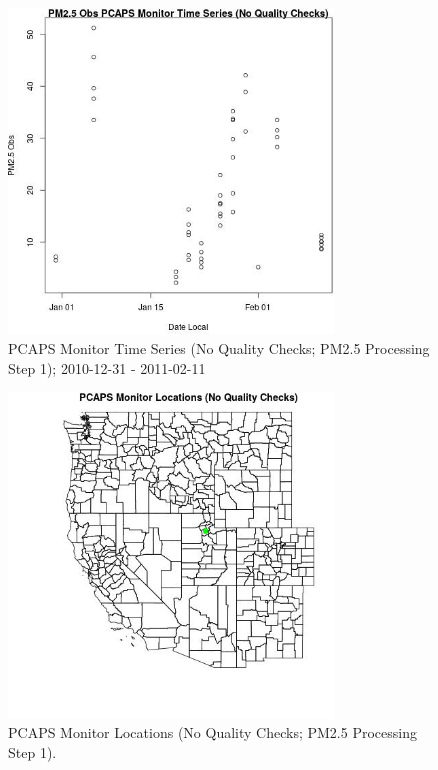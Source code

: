
\begin{figure} 
\centering  
\includegraphics[width=0.77\textwidth]{Code_Outputs/PM25Source4TSstep1_PM25_ObsvDate_Local.jpg} 
\caption{\label{fig:PM25Source4TSstep1PM25_ObsvDate_Local}PCAPS Monitor Time Series (No Quality Checks; PM2.5 Processing Step 1); 2010-12-31 - 2011-02-11} 
\end{figure} 
 

\begin{figure} 
\centering  
\includegraphics[width=0.77\textwidth]{Code_Outputs/PM25Source4TSstep1_MapPCAPSLocations.jpg} 
\caption{\label{fig:PM25Source4TSstep1MapPCAPSLocations}PCAPS Monitor Locations (No Quality Checks; PM2.5 Processing Step 1).} 
\end{figure} 
 
